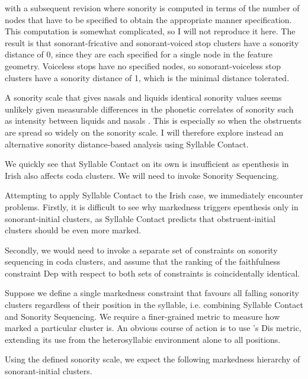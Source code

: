 \documentclass[12pt]{article}
\begin{document}
with a subsequent revision where sonority is computed in terms of the number of nodes that have to be specified to obtain the appropriate manner specification. This computation is somewhat complicated, so I will not reproduce it here. The result is that sonorant-fricative and sonorant-voiced stop clusters have a sonority distance of 0, since they are each specified for a single node in the feature geometry. Voiceless stops have no specified nodes, so sonorant-voiceless stop clusters have a sonority distance of 1, which is the minimal distance tolerated. 

A sonority scale that gives nasals and liquids identical sonority values seems unlikely given measurable differences in the phonetic correlates of sonority such as intensity between liquids and nasals \citep{parker.2002}. This is especially so when the obstruents are spread so widely on the sonority scale. 
I will therefore explore instead an alternative sonority distance-based analysis using Syllable Contact.

\bigskip

We quickly see that Syllable Contact on its own is insufficient as epenthesis in Irish also affects coda clusters. We will need to invoke Sonority Sequencing. 

Attempting to apply Syllable Contact to the Irish case, we immediately encounter problems. Firstly, it is difficult to see why markedness triggers epenthesis only in sonorant-initial clusters, as Syllable Contact predicts that obstruent-initial clusters should be even more marked.

Secondly, we would need to invoke a separate set of constraints on sonority sequencing in coda clusters, and assume that the ranking of the faithfulness constraint {\sc Dep} with respect to both sets of constraints is coincidentally identical.

Suppose we define a single markedness constraint that favours all falling sonority clusters regardless of their position in the syllable, i.e. combining Syllable Contact and Sonority Sequencing. We require a finer-grained metric to measure how marked a particular cluster is. An obvious course of action is to use \citet{gouskova.2002}'s {\sc *Dis} metric, extending its use from the heterosyllabic environment alone to all positions. 

Using the defined sonority scale, we expect the following markedness hierarchy of sonorant-initial clusters.
\end{document}
